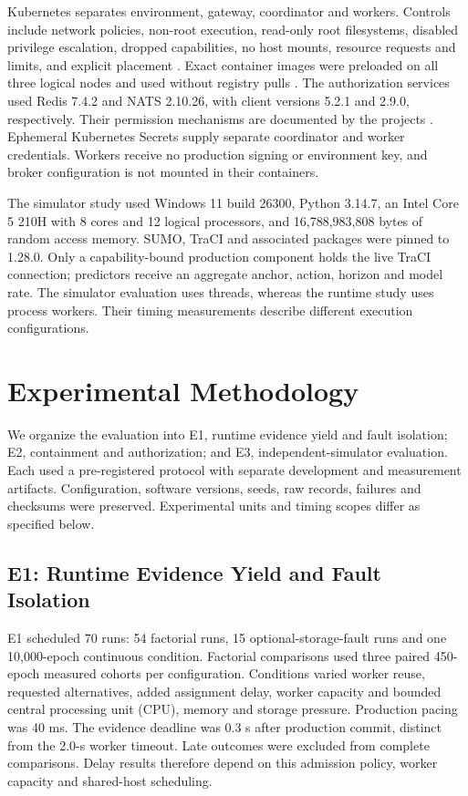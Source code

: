 \documentclass[conference,letterpaper]{IEEEtran}
\begin{document}
Kubernetes separates environment, gateway, coordinator and workers. Controls
include network policies, non-root execution, read-only root filesystems,
disabled privilege escalation, dropped capabilities, no host mounts,
resource requests and limits, and explicit placement
\cite{k8s-networkpolicy,k8s-securitycontext,k8s-resources}. Exact container images
were preloaded on all three logical nodes and used without registry pulls
\cite{k8s-images}. The authorization services used Redis 7.4.2 and NATS 2.10.26,
with client versions 5.2.1 and 2.9.0, respectively. Their permission mechanisms
are documented by the projects \cite{redis-acl,nats-authorization}.
Ephemeral Kubernetes Secrets supply separate coordinator and worker credentials.
Workers receive no production signing or environment key, and broker
configuration is not mounted in their containers.

The simulator study used Windows 11 build 26300, Python 3.14.7, an Intel Core 5
210H with 8 cores and 12 logical processors, and 16,788,983,808 bytes of random
access memory. SUMO, TraCI and associated packages were pinned to 1.28.0.
Only a capability-bound production component holds the live TraCI connection;
predictors receive an aggregate anchor, action, horizon and model rate.
The simulator evaluation uses threads, whereas the runtime study uses process
workers. Their timing measurements describe different execution configurations.

\section{Experimental Methodology}
We organize the evaluation into E1, runtime evidence yield and fault isolation;
E2, containment and authorization; and E3, independent-simulator evaluation.
Each used a pre-registered protocol with separate development and measurement
artifacts. Configuration, software versions, seeds, raw records, failures and
checksums were preserved. Experimental units and timing scopes differ as
specified below.

\subsection{E1: Runtime Evidence Yield and Fault Isolation}
E1 scheduled 70 runs: 54 factorial runs, 15 optional-storage-fault runs and one
10,000-epoch continuous condition. Factorial comparisons used three paired
450-epoch measured cohorts per configuration. Conditions varied worker reuse,
requested alternatives, added assignment delay, worker capacity and bounded
central processing unit (CPU), memory and storage pressure. Production pacing
was 40 ms. The evidence deadline was 0.3 s after production commit, distinct
from the 2.0-s worker timeout. Late outcomes were excluded from complete
comparisons. Delay results therefore depend on this admission policy, worker
capacity and shared-host scheduling.
\end{document}
